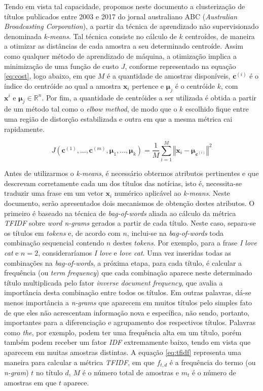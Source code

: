 \documentclass[10pt,twocolumn,letterpaper]{article}
\begin{document}
Tendo em vista tal capacidade, propomos neste documento a clusterização de títulos publicados entre 2003 e 2017 do jornal australiano ABC (\textit{Australian Broadcasting
Corporation}), a partir da técnica de aprendizado não supervisionado denominada \textit{k-means}. Tal técnica consiste no cálculo de \(k\) centroídes, de maneira a otimizar as distâncias de cada amostra a seu determinado centroíde. Assim como qualquer método de aprendizado de máquina, a otimização implica a minimização de uma função de custo \(J\), conforme representado na equação \ref {eq:cost}, logo abaixo, em que  \(M\) é a quantidade de amostras disponíveis, \(\bm{c}^{(i)}\) é o índice do centróide ao qual a amostra \(\bm{x}_i\) pertence e \(\bm{\mu}_j\) é o centróide \(k\), com \(\bm{x}^i \text{ e } \bm{\mu}_j \in \mathbb{R}^n \). Por fim, a quantidade de centróides a ser utilizada é obtida a partir de um método tal como o \textit{elbow method}, de modo que o \(k\) escolhido fique entre uma região de distorção estabilizada e outra em que a mesma métrica cai rapidamente.

\begin{equation}
\label {eq:cost}
J(\bm{c}^{(1)}, ..., \bm{c}^{(m)}, \bm{\mu}_1, ..., \bm{\mu}_k) =  \frac{1}{M} \displaystyle\sum_{i=1}^{M} \left\Vert \bm{x}_i - \bm{\mu}_{\bm{c}^{(i)}} \right\Vert ^2
\end{equation}

Antes de utilizarmos o \textit{k-means}, é necessário obtermos atributos pertinentes e que descrevam corretamente cada um dos títulos das notícias, isto é, necessita-se traduzir uma frase em um vetor \(\bm{x}_i\) numérico aplicável ao \textit{k-means}.  Neste documento, serão apresentados dois mecanismos de obtenção destes atributos. O primeiro é baseado na técnica de \textit{bag-of-words} \cite{7555393} aliada ao cálculo da métrica \textit{TFIDF} sobre \textit{word n-grams} gerados a partir de cada título. Neste caso, separa-se os títulos em \textit{tokens} e, de acordo com \(n\), inclui-se na \textit{bag-of-words} toda combinação sequencial contendo \(n\) destes \textit{tokens}. Por exemplo, para a frase \textit{I love cat} e \(n = 2\), consideraríamos \textit{I love} e \textit{love cat}. Uma vez inseridas todas as combinações na \textit{bag-of-words}, a próxima etapa, para cada título, é calcular a frequência (ou \textit{term frequency}) que cada combinação aparece neste determinado título multiplicada pelo fator \textit{inverse document frequency}, que avalia a importância desta combinação entre todos os títulos. Em outras palavras, dá-se menos importância a \textit{n-grams} que aparecem em muitos títulos pelo simples fato de que eles não acrescentam informação nova e específica, não sendo, portanto, importantes para a diferenciação e agrupamento dos respectivos títulos. Palavras como \textit{the}, por exemplo, podem ter uma frequência alta em um título, porém também podem receber um fator \textit{IDF} extremamente baixo, tendo em vista que aparecem em muitas amostras distintas. A equação \ref {eq:tfidf} representa uma maneira para calcular a métrica \textit{TFIDF}, em que \(f_{t,d}\) é a frequência do termo (ou \textit{n-gram}) \(t\) no título \(d\), \(M\) é o número total de amostras e \(m_t\) é o número de amostras em que \(t\) aparece.
\end{document}
